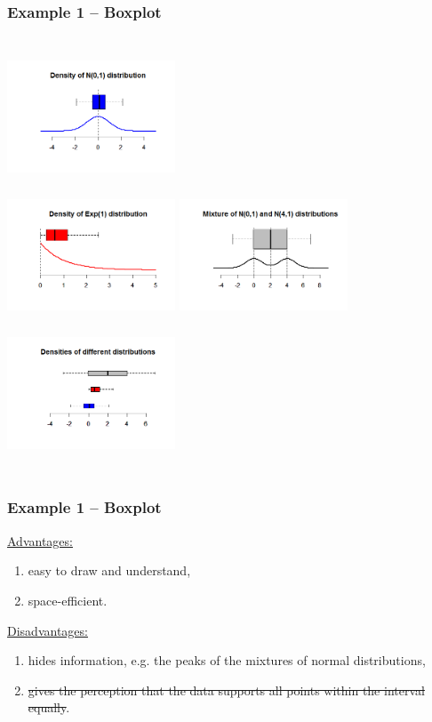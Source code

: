\documentclass[11pt,usenames,dvipsnames,svgnames,x11names]{beamer}
\theoremstyle{plain}
\theoremstyle{definition}
\theoremstyle{remark}
\begin{document}
\begin{frame}
	\frametitle{Example 1 -- Boxplot}
	\begin{columns}[t]
			\centering
			\includegraphics[width=5cm,height=4cm]{111.png}\\
			\includegraphics[width=5cm,height=4cm]{222.png}
		\centering
		\includegraphics[width=5cm,height=4cm]{333.png}\\
		\includegraphics[width=5cm,height=4cm]{444.png}
	\end{columns}
\end{frame}

\begin{frame}
	\frametitle{Example 1 -- Boxplot}
	\underline{Advantages:}	
	\begin{enumerate}
		\item easy to draw and understand,
		\item space-efficient.
	\end{enumerate}
	\bigskip
	\underline{Disadvantages:}
	\begin{enumerate}
		\item hides information, e.g. the peaks of the mixtures of normal distributions,
		\item \sout{gives the perception that the data supports all points within the interval equally}.
	\end{enumerate}
\end{frame}
\end{document}
